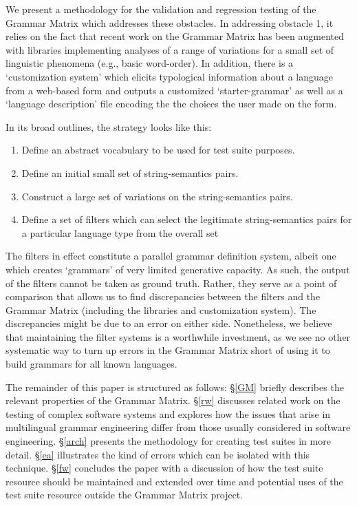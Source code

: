 \documentclass[11pt]{article}
\begin{document}
We present a methodology for the validation and regression testing of
the Grammar Matrix which addresses these obstacles.  In addressing
obstacle 1, it relies on the fact that recent work on the Grammar
Matrix \cite{Ben:Fli:05,Dre:Ben:05} has been augmented with libraries
implementing analyses of a range of variations for a small set of
linguistic phenomena (e.g., basic word-order).  In addition, there is
a `customization system' which elicits typological information about a
language from a web-based form and outputs a customized
`starter-grammar' as well as a `language description' file encoding
the the choices the user made on the form.

In its broad outlines, the strategy looks like this:

\begin{enumerate}
\item Define an abstract vocabulary to be used for test suite purposes.
\item Define an initial small set of string-semantics pairs.
\item Construct a large set of variations on the string-semantics pairs.
\item Define a set of filters which can select the legitimate string-semantics pairs for a particular language type from the overall set
\end{enumerate}
%
The filters in effect constitute a parallel grammar definition
system, albeit one which creates `grammars' of very limited generative
capacity.  As such, the output of the filters cannot be taken as
ground truth.  Rather, they serve as a point of comparison that allows
us to find discrepancies between the filters and the Grammar Matrix
(including the libraries and customization system). The discrepancies
might be due to an error on either side.  Nonetheless, we believe that
maintaining the filter systems is a worthwhile investment, as we see
no other systematic way to turn up errors in the Grammar Matrix short
of using it to build grammars for all known languages.

The remainder of this paper is structured as follows: \S\ref{GM} briefly
describes the relevant properties of the Grammar Matrix. \S\ref{rw} discusses
related work on the testing of complex software systems and explores how
the issues that arise in multilingual grammar engineering differ from those
usually considered in software engineering. \S\ref{arch} presents the 
methodology for creating test suites in more detail.  \S\ref{ea} illustrates
the kind of errors which can be isolated with this technique.  \S\ref{fw}
concludes the paper with a discussion of how the test suite resource should
be maintained and extended over time and potential uses of the test suite
resource outside the Grammar Matrix project.
\end{document}
